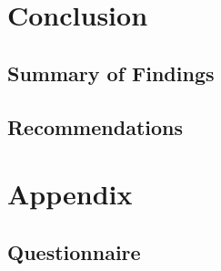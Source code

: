 \documentclass[12pt]{report}
\begin{document}
\begin{multicols}{2}
\end{multicols}

\chapter{Conclusion}
\begin{multicols}{2}

\section{Summary of Findings}
\section{Recommendations}

\end{multicols}

\printbibliography[heading=bibnumbered]

\chapter{Appendix}
\section{Questionnaire}

\end{document}
